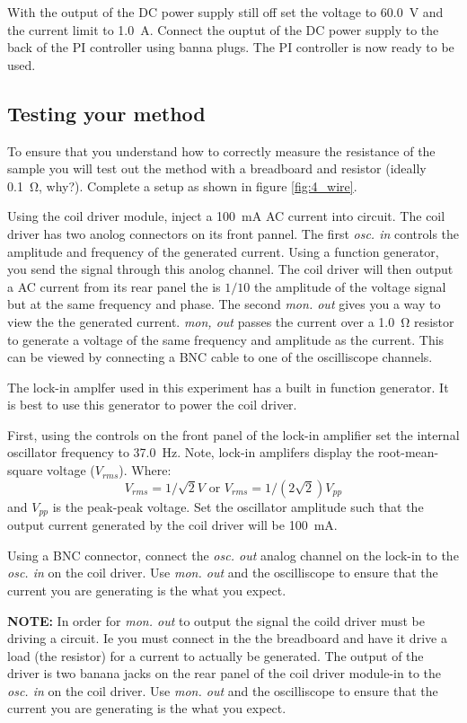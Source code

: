 \documentclass{apl-guide}
\begin{document}
With the output of the DC power supply still off set the voltage to
\SI{60.0}{\V} and the current limit to \SI{1.0}{\A}. Connect the ouptut of the
DC power supply to the back of the PI controller using banna plugs. The PI
controller is now ready to be used. 


\subsection{Testing your method}
To ensure that you understand how to correctly measure the resistance of the
sample you will test out the method with a breadboard and resistor (ideally
\SI{0.1}{\ohm}, why?). Complete a setup as shown in figure \ref{fig:4_wire}.

Using the coil driver module, inject a \SI{100}{\mA} AC current into circuit.
The coil driver has two anolog connectors on its front pannel. The first
\emph{osc. in} controls the amplitude and frequency of the generated current.
Using a function generator, you send the signal through this anolog channel. The
coil driver will then output a AC current from its rear panel the is $1/10$ the
amplitude of the voltage signal but at the same frequency and phase. 
The second \emph{mon. out} gives you a way to view the the generated current.
\emph{mon, out} passes the current over a \SI{1.0}{\ohm} resistor to generate a
voltage of the same frequency and amplitude as the current. This can be viewed
by connecting a BNC cable to one of the oscilliscope channels. 

The lock-in amplfer used in this experiment has a built in function generator.
It is best to use this generator to power the coil driver. 

First, using the controls on the front panel of the lock-in amplifier set the
internal oscillator frequency to \SI{37.0}{\hertz}. Note, lock-in amplifers
display the root-mean-square voltage ($V_{rms}$). Where:
$$V_{rms} = 1/\sqrt{2} V \text{    or     } V_{rms} = 1/(2\sqrt{2}) V_{pp}$$
and $V_{pp}$ is the peak-peak voltage. Set the oscillator amplitude such that
the output current generated by the coil driver will be \SI{100}{\mA}.

Using a BNC connector, connect the \emph{osc. out} analog channel on the lock-in
to the \emph{osc. in} on the coil driver. Use \emph{mon. out} and the
oscilliscope to ensure that the current you are generating is the what you
expect.

\textbf{NOTE:} In order for \emph{mon. out} to output the signal the coild
driver must be driving a circuit. Ie you must connect in the the breadboard and
have it drive a load (the resistor) for a current to actually be generated. The
output of the driver is two banana jacks on the rear panel of the coil driver
module-in to the \emph{osc. in} on the coil driver. Use \emph{mon. out} and the
oscilliscope to ensure that the current you are generating is the what you
expect.
\end{document}

